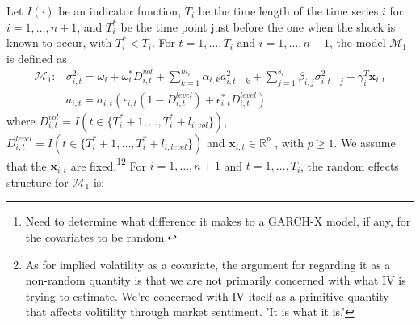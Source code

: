 \documentclass[11pt]{article}
\newcommand{\R}{\mathbb{R}}
\newcommand{\x}{\textbf{x}}
\def\mbf#1{\mathbf{#1}} %
\def\mc#1{\mathcal{#1}} %
\def\mc#1{\mathcal{#1}}
\theoremstyle{definition}
\begin{document}
Let $I(\cdot)$ be an indicator function, $T_i$ be the time length of the time series $i$ for $i = 1, \ldots, n+1$, and $T_i^*$ be the time point just before the one when the shock is known to occur, with $T_i^* < T_i$.  For $t= 1, \ldots, T_i$ and $i = 1, \ldots, n+1$, the model $\mc{M}_1$ is defined as
\begin{align}
\mc{M}_1 \colon &\sigma^{2}_{i,t} = \omega_{i} + \omega^{*}_i D^{vol}_{i,t}  + \sum^{m_{i}}_{k=1}\alpha_{i,k}a^{2}_{i,t-k} + \sum_{j=1}^{s_{i}}\beta_{i,j}\sigma_{i,t-j}^{2} + \gamma_{i}^{T} \x_{i,t}\\
&a_{i,t} = \sigma_{i,t}(\epsilon_{i,t}(1-D^{level}_{i,t}) + \epsilon^{*}_{i,t}D^{level}_{i,t}) \label{equation1}
\end{align}
 where $D^{vol}_{i,t} = I(t \in \{T_i^* + 1,...,T_i^* + l_{i, vol}\})$, $D^{level}_{i,t} = I(t \in \{T_i^* + 1,...,T_i^* + l_{i, level}\})$ 
and $\x_{i,t} \in \R^{p}$ , with $p \geq 1$.  We assume that the 
$\mbf{x}_{i,t}$ are fixed.\footnote{Need to determine what difference it makes to a GARCH-X model, if any, for the covariates to be random.}\footnote{As for implied volatility as a covariate, the argument for regarding it as a non-random quantity is that we are not primarily concerned with what IV is trying to estimate.  We're concerned with IV itself as a primitive quantity that affects volitility through market sentiment. 'It is what it is.'}  For $i = 1, \ldots, n+1$ and $t=1, \ldots, T_i$, the random effects structure for $\mc{M}_1$ is:
\end{document}
